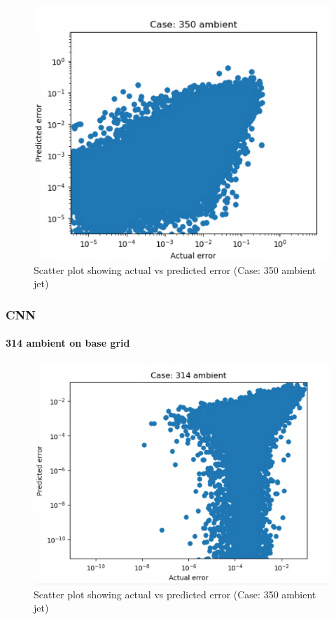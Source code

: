 \documentclass{article}
\begin{document}
\begin{figure}[h!]
    \centering
    \includegraphics[width = 0.6\linewidth]{figures/314_350_01_error_scatter.png}
    \caption{Scatter plot showing actual vs predicted error (Case: 350 ambient jet)}
    \label{amr_err}
\end{figure}

\subsubsection{CNN}

\paragraph{314 ambient on base grid}

\begin{figure}[h!]
    \centering
    \includegraphics[width = 0.6\linewidth]{figures/314_01_cnn_error_scatter.png}
    \caption{Scatter plot showing actual vs predicted error (Case: 350 ambient jet)}
    \label{amr_err}
\end{figure}
\end{document}
